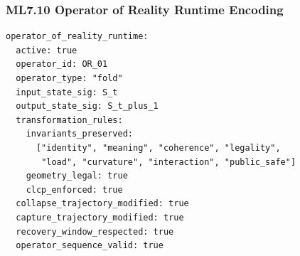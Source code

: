 
\subsubsection*{ML7.10 Operator of Reality Runtime Encoding}

\begin{verbatim}
operator_of_reality_runtime:
  active: true
  operator_id: OR_01
  operator_type: "fold"
  input_state_sig: S_t
  output_state_sig: S_t_plus_1
  transformation_rules:
    invariants_preserved:
      ["identity", "meaning", "coherence", "legality",
       "load", "curvature", "interaction", "public_safe"]
    geometry_legal: true
    clcp_enforced: true
  collapse_trajectory_modified: true
  capture_trajectory_modified: true
  recovery_window_respected: true
  operator_sequence_valid: true
\end{verbatim}
